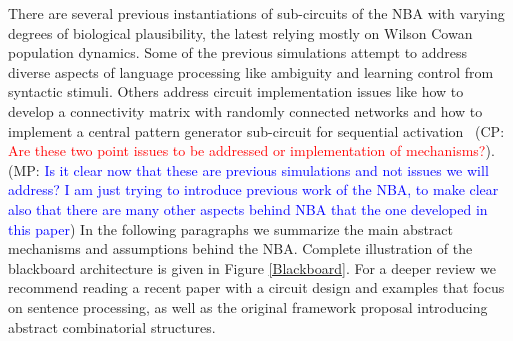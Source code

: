 \documentclass[10pt]{article}
\newcommand{\noteCP}[1]{(CP: \textcolor{red}{#1})}
\newcommand{\noteMP}[2]{(MP: \textcolor{blue}{#1})}
\begin{document}
There are several previous instantiations of sub-circuits of the NBA with varying degrees of biological plausibility, the latest relying mostly on Wilson Cowan population dynamics\cite{Destexhe_2009}.
Some of the previous simulations attempt to address diverse aspects of language processing like ambiguity\cite{Frank_2014} and learning control from syntactic stimuli\cite{van_der_Velde_2010}.
Others address circuit implementation issues like how to develop a connectivity matrix with randomly connected networks\cite{van_der_Velde_2011} and how to implement a central pattern generator sub-circuit for sequential activation~\cite{van_Dijk_2015}
\noteCP{Are these two point issues to be addressed or implementation of mechanisms?}.
\noteMP{Is it clear now that these are previous simulations and not issues we will address? I am just trying to introduce previous work of the NBA, to make clear also that there are many other aspects behind NBA that the one developed in this paper}.
In the following paragraphs we summarize the main abstract mechanisms and assumptions behind the NBA. Complete illustration of the blackboard architecture is given in Figure {\ref{Blackboard}}.
For a deeper review we recommend reading a recent paper with a circuit design and examples that focus on sentence processing\cite{de2016combinatorial}, as well as the original framework proposal introducing abstract combinatorial structures\cite{van_der_Velde_2006}.
\end{document}
